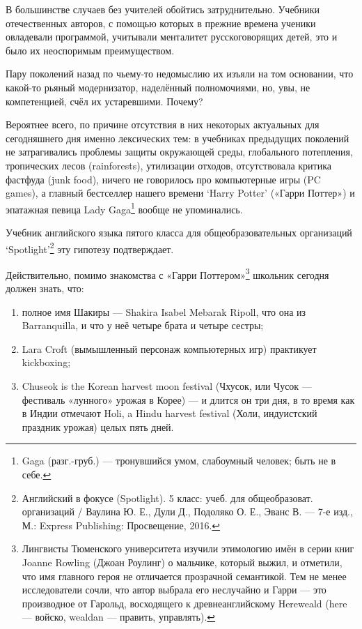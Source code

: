 В большинстве случаев без учителей обойтись затруднительно. Учебники отечественных авторов, с помощью которых в прежние времена ученики овладевали программой, учитывали менталитет русскоговорящих детей, это и было их неоспоримым преимуществом.

Пару поколений назад по чьему-то недомыслию их изъяли на том основании, что какой-то рьяный модернизатор, наделённый полномочиями, но, увы, не компетенцией, счёл их устаревшими. Почему?

Вероятнее всего, по причине отсутствия в них некоторых актуальных для сегодняшнего дня именно лексических тем: в учебниках предыдущих поколений не затрагивались проблемы защиты окружающей среды, глобального потепления, тропических лесов (rainforests), утилизации отходов, отсутствовала критика фастфуда (junk food), ничего не говорилось про компьютерные игры (PC games), а главный бестселлер нашего времени ‘Harry Potter’ («Гарри Поттер») и эпатажная певица Lady Gaga\footnote{Gaga (разг.-груб.) — тронувшийся умом, слабоумный человек; быть не в себе.} вообще не упоминались.

Учебник английского языка пятого класса для общеобразовательных организаций ‘Spotlight’\footnote{Английский в фокусе (Spotlight). 5 класс: учеб. для общеобразоват. организаций / Ваулина Ю. Е., Дули Д., Подоляко О. Е., Эванс В. — 7-е изд., М.: Express Publishing: Просвещение, 2016.} эту гипотезу подтверждает.

Действительно, помимо знакомства с «Гарри Поттером»\footnote{Лингвисты Тюменского университета изучили этимологию имён в серии книг Joanne Rowling (Джоан Роулинг) о мальчике, который выжил, и отметили, что имя главного героя не отличается прозрачной семантикой. Тем не менее исследователи сочли, что автор выбрала его неслучайно и Гарри — это производное от Гарольд, восходящего к древнеанглийскому Hereweald (here — войско, wealdan — править, управлять).} школьник сегодня должен знать, что:

\begin{enumerate}
    \item полное имя Шакиры — Shakira Isabel Mebarak Ripoll, что она из Barranquilla, и что у неё четыре брата и четыре сестры;
    \item Lara Croft (вымышленный персонаж компьютерных игр) практикует kickboxing;
    \item Chuseok is the Korean harvest moon festival (Чхусок, или Чусок — фестиваль «лунного» урожая в Корее) — и длится он три дня, в то время как в Индии отмечают Holi, a Hindu harvest festival (Холи, индуистский праздник урожая) целых пять дней.
\end{enumerate}

